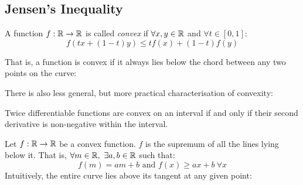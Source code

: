 \documentclass[../main.tex]{subfiles}
\begin{document}
\subsection{Jensen's Inequality}
\begin{definition}
  A function $f: \mathbb{R} \to \mathbb{R}$ is called \textit{convex} if $\forall x, y \in \mathbb{R}$ and $\forall t \in [0, 1]$:
  \[
    f(tx + (1 - t)y) \leq tf(x) + (1 - t)f(y)
  \]
\end{definition}
That is, a function is convex if it always lies below the chord between any two points on the curve:
\begin{center}
\end{center}
\begin{remark}
  There is also less general, but more practical characterisation of convexity:

  Twice differentiable functions are convex on an interval if and only if their second derivative is non-negative within the interval.
\end{remark}
\begin{lemma}
  Let $f: \mathbb{R} \to \mathbb{R}$ be a convex function.
  $f$ is the supremum of all the lines lying below it.
  That is, $\forall m \in \mathbb{R},\ \exists a, b \in \mathbb{R}$ such that:
  \label{convexLemma}
  \[
    f(m) = am + b \text{ and } f(x) \geq ax + b\ \forall x
  \]
  Intuitively, the entire curve lies above its tangent at any given point:
  \begin{center}
  \end{center}
\end{lemma}
\end{document}
